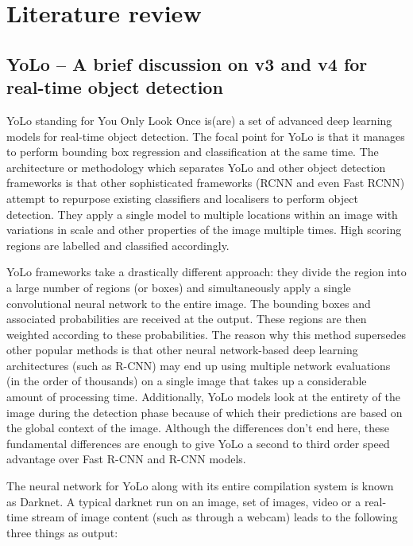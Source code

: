 \chapter{Literature review} \label{chapter2}

\section{YoLo – A brief discussion on v3 and v4 for real-time object detection} \label{brief_discuss}
YoLo standing for You Only Look Once is(are) a set of advanced deep learning models for real-time object detection. The focal point for YoLo is that it manages to perform bounding box regression and classification at the same time. The architecture or methodology which separates YoLo and other object detection frameworks is that other sophisticated frameworks (RCNN and even Fast RCNN) attempt to repurpose existing classifiers and localisers to perform object detection. They apply a single model to multiple locations within an image with variations in scale and other properties of the image multiple times. High scoring regions are labelled and classified accordingly. \par

YoLo frameworks take a drastically different approach: they divide the region into a large number of regions (or boxes) and simultaneously apply a single convolutional neural network to the entire image. The bounding boxes and associated probabilities are received at the output. These regions are then weighted according to these probabilities. The reason why this method supersedes other popular methods is that other neural network-based deep learning architectures (such as R-CNN) may end up using multiple network evaluations (in the order of thousands) on a single image that takes up a considerable amount of processing time. Additionally, YoLo models look at the entirety of the image during the detection phase because of which their predictions are based on the global context of the image. Although the differences don’t end here, these fundamental differences are enough to give YoLo a second to third order speed advantage over Fast R-CNN and R-CNN models. \par

The neural network for YoLo along with its entire compilation system is known as Darknet. A typical darknet run on an image, set of images, video or a real-time stream of image content (such as through a webcam) leads to the following three things as output:

